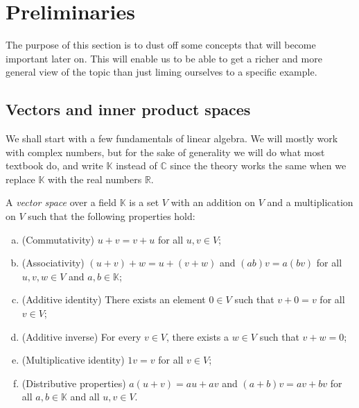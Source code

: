
\section{Preliminaries}\label{kugel:sec:preliminaries}

The purpose of this section is to dust off some concepts that will become
important later on. This will enable us to be able to get a richer and more
general view of the topic than just liming ourselves to a specific example.

\subsection{Vectors and inner product spaces}

We shall start with a few fundamentals of linear algebra. We will mostly work
with complex numbers, but for the sake of generality we will do what most
textbook do, and write \(\mathbb{K}\) instead of \(\mathbb{C}\) since the
theory works the same when we replace \(\mathbb{K}\) with the real
numbers \(\mathbb{R}\).

\begin{definition}
  \label{kugel:def:vector-space} \nocite{axler_linear_2014}
  A \emph{vector space} over a field \(\mathbb{K}\) is a set \(V\) with an
  addition on \(V\) and a multiplication on \(V\) such that the following
  properties hold:
  \begin{enumerate}[(a)]
    \item (Commutativity) \(u + v = v + u\) for all \(u, v \in V\);
    \item (Associativity) \((u + v) + w = u + (v + w)\) and \((ab)v = a(bv)\)
      for all \(u, v, w \in V\) and \(a, b \in \mathbb{K}\);
    \item (Additive identity) There exists an element \(0 \in V\) such that
      \(v + 0 = v\) for all \(v \in V\);
    \item (Additive inverse) For every \(v \in V\), there exists a \(w \in V\)
      such that \(v + w = 0\);
    \item (Multiplicative identity) \(1 v = v\) for all \(v \in V\);
    \item (Distributive properties) \(a(u + v) = au + av\) and \((a + b)v = av +
      bv\) for all \(a, b \in \mathbb{K}\) and all \(u,v \in V\).
  \end{enumerate}
\end{definition}

